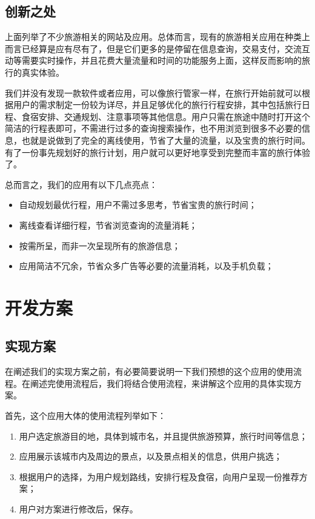 \documentclass[12pt,a4paper]{article}
\begin{document}
\begin{CJK}{UTF8}{gbsn}
	\subsection{创新之处}
	上面列举了不少旅游相关的网站及应用。总体而言，现有的旅游相关应用在种类上而言已经算是应有尽有了，但是它们更多的是停留在信息查询，交易支付，交流互动等需要实时操作，并且花费大量流量和时间的功能服务上面，这样反而影响的旅行的真实体验。	

	我们并没有发现一款软件或者应用，可以像旅行管家一样，在旅行开始前就可以根据用户的需求制定一份较为详尽，并且足够优化的旅行行程安排，其中包括旅行日程、食宿安排、交通规划、注意事项等其他信息。用户只需在旅途中随时打开这个简洁的行程表即可，不需进行过多的查询搜索操作，也不用浏览到很多不必要的信息，也就是说做到了完全的离线使用，节省了大量的流量，以及宝贵的旅行时间。有了一份事先规划好的旅行计划，用户就可以更好地享受到完整而丰富的旅行体验了。	

	总而言之，我们的应用有以下几点亮点：
	\begin{itemize}
	\item 自动规划最优行程，用户不需过多思考，节省宝贵的旅行时间；
	\item 离线查看详细行程，节省浏览查询的流量消耗；
	\item 按需所呈，而非一次呈现所有的旅游信息；
	\item 应用简洁不冗余，节省众多广告等必要的流量消耗，以及手机负载；
	\end{itemize}	

\clearpage
\section{开发方案}

	\subsection{实现方案}
	在阐述我们的实现方案之前，有必要简要说明一下我们预想的这个应用的使用流程。在阐述完使用流程后，我们将结合使用流程，来讲解这个应用的具体实现方案。

	首先，这个应用大体的使用流程列举如下：
	\begin{enumerate}
		\item
		用户选定旅游目的地，具体到城市名，并且提供旅游预算，旅行时间等信息；
		\item
		应用展示该城市内及周边的景点，以及景点相关的信息，供用户挑选；
		\item
		根据用户的选择，为用户规划路线，安排行程及食宿，向用户呈现一份推荐方案；
		\item
		用户对方案进行修改后，保存。
	\end{enumerate}
	

\end{CJK}
\end{document}
